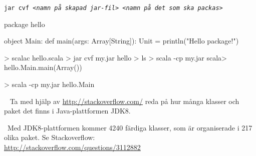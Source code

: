 \texttt{jar cvf \textit{<namn på skapad jar-fil> <namn på det som ska packas>}}

\SubtaskSolved
\begin{Code}
package hello

object Main:
  def main(args: Array[String]): Unit = println("Hello package!")
\end{Code}

\SubtaskSolved
\begin{REPL}
> scalac hello.scala
> jar cvf my.jar hello
> ls
> scala -cp my.jar
scala> hello.Main.main(Array())
\end{REPL}

\SubtaskSolved
\begin{REPL}
> scala -cp my.jar hello.Main
\end{REPL}

\QUESTEND





\QUESTBEGIN

\Task\Uberkurs \what~ Ta med hjälp av \url{http://stackoverflow.com/} reda på hur många klasser och paket det finns i Java-plattformen JDK8.

\SOLUTION

\TaskSolved \what~Med JDK8-plattformen kommer 4240 färdiga klasser, som är organiserade i 217 olika paket. Se Stackoverflow: \\\url{http://stackoverflow.com/questions/3112882}

\QUESTEND
